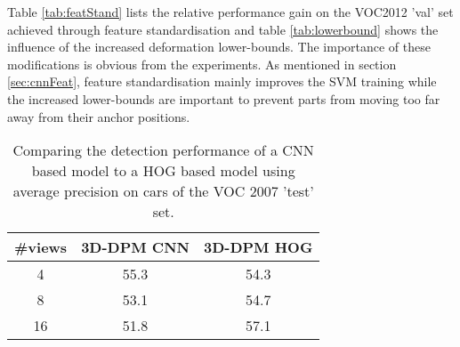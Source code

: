 Table \ref{tab:featStand} lists the relative performance gain on the VOC2012 'val' set achieved through feature standardisation and table \ref{tab:lowerbound} shows the influence of the increased deformation lower-bounds. The importance of these modifications is obvious from the experiments. As mentioned in section \ref{sec:cnnFeat}, feature standardisation mainly improves the SVM training while the increased lower-bounds are important to prevent parts from moving too far away from their anchor positions. 

\begin{table}[]
	\begin{center}
		\begin{tabular}{|c|c|c|}
		\hline
		\#views & 3D-DPM CNN & 3D-DPM HOG\\
		\hline\hline
		4 &  55.3  & 54.3\\
		\hline
		8 & 53.1 &  54.7\\
		\hline
		16 & 51.8 &  57.1 \\
		\hline
		\end{tabular}
	\end{center}
\caption{Comparing the detection performance of a CNN based model to a HOG based model using average precision on cars of the VOC 2007 'test' set.}\label{tab:cnn2007}
\end{table}


